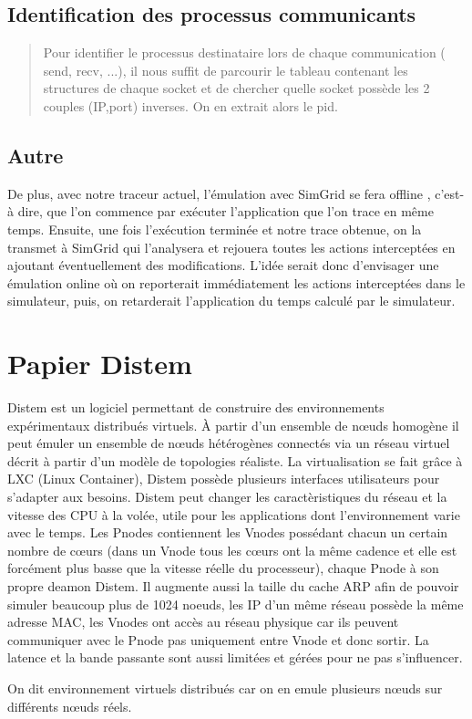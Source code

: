 \documentclass{article}
\begin{document}
\subsection{Identification des processus communicants}
\begin{quotation}
Pour identifier le processus destinataire lors de chaque communication ( send,
recv, ...), il nous suffit de parcourir le tableau contenant les structures de
chaque socket et de chercher quelle socket possède les 2 couples (IP,port)
inverses. On en extrait alors le pid.
\end{quotation}

\subsection{Autre}
De plus, avec notre traceur actuel, l’émulation avec SimGrid se fera offline ,
c’est-à dire, que l’on commence par exécuter l’application que l’on trace en
même temps. Ensuite, une fois l’exécution terminée et notre trace obtenue, on la
transmet à SimGrid qui l’analysera et rejouera toutes les actions interceptées
en ajoutant éventuellement des modifications. L’idée serait donc d’envisager une
émulation online où on reporterait immédiatement les actions interceptées dans
le simulateur, puis, on retarderait l’application du temps calculé par le
simulateur.

\section{Papier Distem}
Distem est un logiciel permettant de construire des environnements expérimentaux
distribués virtuels. À partir d'un ensemble de n\oe uds homogène il peut émuler
un ensemble de n\oe uds hétérogènes connectés via un réseau virtuel décrit à
partir d'un modèle de topologies réaliste. La virtualisation se fait grâce à
LXC (Linux Container), Distem possède plusieurs interfaces utilisateurs pour s'adapter aux
besoins. Distem peut changer les caractèristiques du réseau et la vitesse des
CPU à la volée, utile pour les applications dont l'environnement varie avec le temps. Les Pnodes contiennent les Vnodes possédant chacun un certain nombre de c\oe urs (dans un Vnode tous les c\oe urs ont la même cadence et elle est forcément plus basse que la vitesse réelle du processeur), chaque Pnode à son propre deamon Distem. Il augmente aussi la taille du cache ARP afin de pouvoir simuler beaucoup plus de 1024 noeuds, les IP d'un même réseau possède la même adresse MAC, les Vnodes ont accès au réseau physique car ils peuvent communiquer avec le Pnode pas uniquement entre Vnode et donc sortir. La latence et la bande passante sont aussi limitées et gérées pour ne pas s'influencer.

On dit environnement virtuels distribués car on en emule plusieurs n\oe uds sur différents n\oe uds réels.
\end{document}
